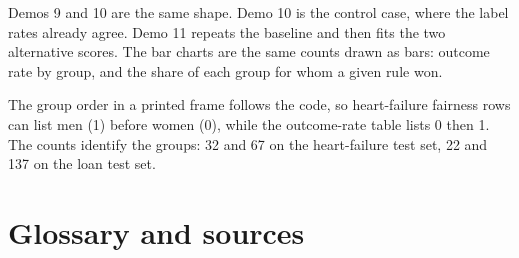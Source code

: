 \documentclass[11pt]{article}
\begin{document}
Demos 9 and 10 are the same shape. Demo 10 is the control case, where the label rates already agree. Demo 11 repeats the baseline and then fits the two alternative scores. The bar charts are the same counts drawn as bars: outcome rate by group, and the share of each group for whom a given rule won.

The group order in a printed frame follows the code, so heart-failure fairness rows can list men (1) before women (0), while the outcome-rate table lists 0 then 1. The counts identify the groups: 32 and 67 on the heart-failure test set, 22 and 137 on the loan test set.

\section{Glossary and sources}
\label{sec:glossary}
\end{document}
